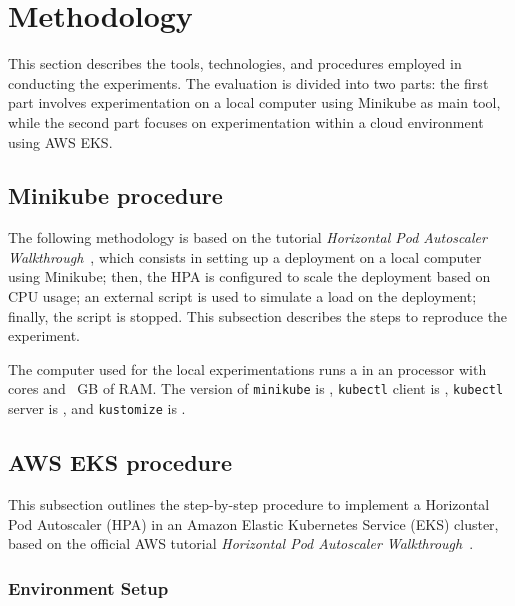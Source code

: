 \section{Methodology}

This section describes the tools, technologies, and procedures employed in conducting the experiments.
The evaluation is divided into two parts: the first part involves experimentation on a local computer using Minikube as main tool, while the second part focuses on experimentation within a cloud environment using AWS EKS.

\subsection{Minikube procedure}
The following methodology is based on the tutorial \textit{Horizontal Pod Autoscaler Walkthrough}~\cite{KubernetesHpaWalkthrough}, which consists in setting up a deployment on a local computer using Minikube; then, the HPA is configured to scale the deployment based on CPU usage; an external script is used to simulate a load on the deployment; finally, the script is stopped.
This subsection describes the steps to reproduce the experiment.





The computer used for the local experimentations runs a \operatingSystem{} in an \cpuModel{} processor with \cpuCores{} cores and \cpuRam{}~GB of RAM.
The version of \texttt{minikube} is \minikubeVersion{}, \texttt{kubectl} client is \kubectlClientVersion{}, \texttt{kubectl} server is \kubectlServerVersion{}, and \texttt{kustomize} is \kubectlKustomizeVersion{}.

\subsection{AWS EKS procedure} %

This subsection outlines the step-by-step procedure to implement a Horizontal Pod Autoscaler (HPA) in an Amazon Elastic Kubernetes Service (EKS) cluster, based on the official AWS tutorial \textit{Horizontal Pod Autoscaler Walkthrough}~\cite{AwsHorizontalPodAutoescaler}.

\subsubsection{Environment Setup}

